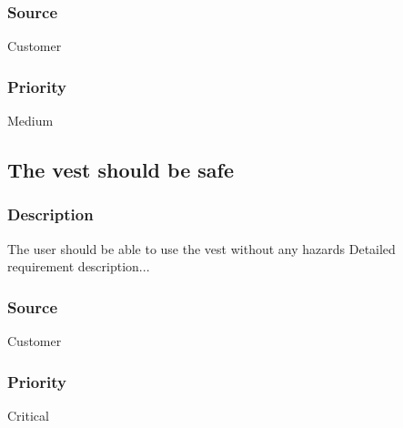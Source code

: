 \subsubsection{Source}
Customer
\subsubsection{Priority}
Medium

\subsection{The vest should be safe}
\subsubsection{Description}
The user should be able to use the vest without any hazards
Detailed requirement description...
\subsubsection{Source}
Customer
\subsubsection{Priority}
Critical
